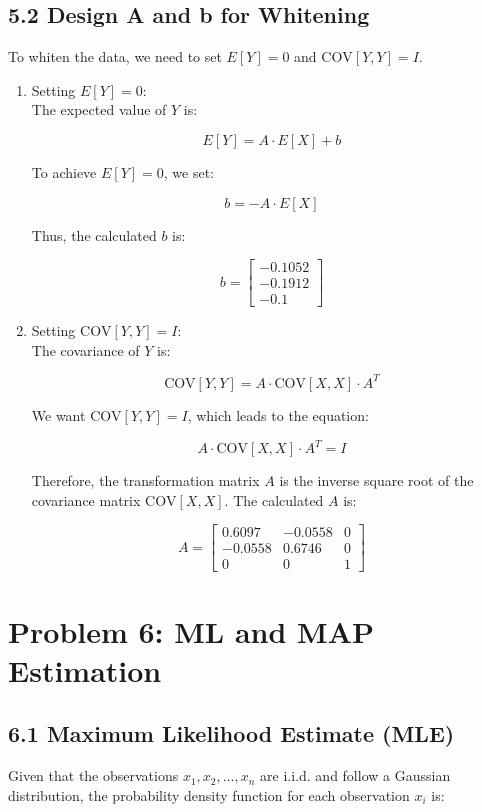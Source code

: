 \documentclass{article}
\begin{document}
\subsection*{5.2 Design A and b for Whitening}
To whiten the data, we need to set $E[Y] = 0$ and $\text{COV}[Y, Y] = I$.
\begin{enumerate}
    \item Setting $E[Y] = 0$: \\
    The expected value of $Y$ is:

    \[
    E[Y] = A \cdot E[X] + b
    \]

    To achieve $E[Y] = 0$, we set:

    \[
    b = -A \cdot E[X]
    \]

    Thus, the calculated $b$ is:

    \[
    b = \begin{bmatrix} -0.1052 \\ -0.1912 \\ -0.1 \end{bmatrix}
    \]

    \item Setting $\text{COV}[Y, Y] = I$: \\
    The covariance of $Y$ is:

    \[
    \text{COV}[Y, Y] = A \cdot \text{COV}[X, X] \cdot A^T
    \]

    We want $\text{COV}[Y, Y] = I$, which leads to the equation:

    \[
    A \cdot \text{COV}[X, X] \cdot A^T = I
    \]

    Therefore, the transformation matrix $A$ is the inverse square root of the
    covariance matrix $\text{COV}[X, X]$. The calculated $A$ is:

    \[
    A = \begin{bmatrix} 0.6097 & -0.0558 & 0 \\ -0.0558 & 0.6746 & 0 \\ 0 & 0 & 1 \end{bmatrix}
    \]
\end{enumerate}

\section*{Problem 6: ML and MAP Estimation}

\subsection*{6.1 Maximum Likelihood Estimate (MLE)}
Given that the observations $x_1, x_2, \dots, x_n$ are i.i.d. and follow a Gaussian distribution, the probability density function for each observation $x_i$ is:
\end{document}
